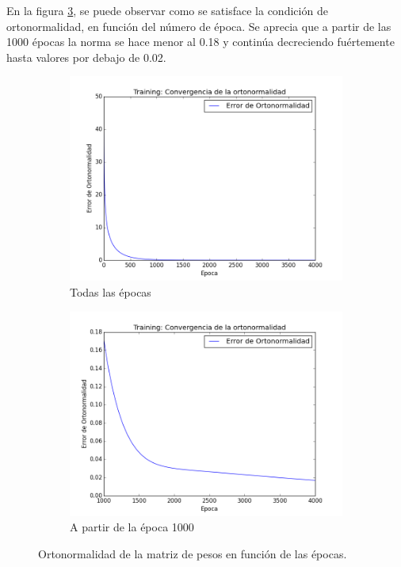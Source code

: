 \par En la figura \ref{fig: ej1_oja_errores}, se puede observar como se satisface la condición de ortonormalidad, en función del número de época. Se aprecia que a partir de las 1000 épocas la norma se hace menor al 0.18 y continúa decreciendo fuértemente hasta valores por debajo de 0.02.


\begin{figure}[H]
        \begin{subfigure}[b]{0.5\textwidth}
                \includegraphics[width=\linewidth]{secciones/graficos/oja/error.png}
                \caption{Todas las épocas}
                \label{fig: ej1_oja_error}
        \end{subfigure}
        \begin{subfigure}[b]{0.5\textwidth}
                \includegraphics[width=\linewidth]{secciones/graficos/oja/error_zoom.png}
                \caption{A partir de la época 1000}
                \label{fig: ej1_oja_error_zoom}
        \end{subfigure}
        \caption{Ortonormalidad de la matriz de pesos en función de las épocas.}
        \label{fig: ej1_oja_errores}
\end{figure}


